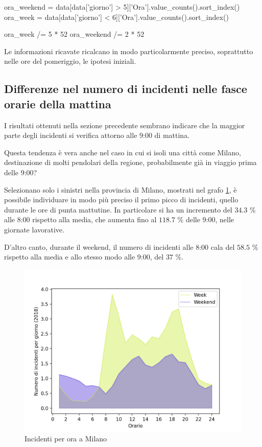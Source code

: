 \documentclass[a4paper,12pt]{report}
\begin{document}
\begin{code}[language=Python]
ora_weekend = data[data['giorno'] > 5]['Ora'].value_counts().sort_index()
ora_week = data[data['giorno'] < 6]['Ora'].value_counts().sort_index()

ora_week /= 5 * 52
ora_weekend /= 2 * 52
\end{code}

Le informazioni ricavate ricalcano in modo particolarmente preciso, 
soprattutto nelle ore del pomeriggio, le ipotesi iniziali. 

\subsection{Differenze nel numero di incidenti nelle fasce orarie della mattina}

I risultati ottenuti nella sezione precedente sembrano indicare 
che la maggior parte degli incidenti si verifica attorno alle 9:00 di mattina. 

Questa tendenza è vera anche nel caso in cui si isoli una città come Milano, 
destinazione di molti pendolari della regione, probabilmente 
già in viaggio prima delle 9:00?

Selezionano solo i sinistri nella provincia di Milano, mostrati nel grafo 
\ref{fig:week-weekend-milano}, è possibile individuare in modo più preciso
il primo picco di incidenti, quello durante le ore di punta mattutine. 
In particolare si ha un incremento del $34.3$ \% alle 8:00 rispetto alla media, 
che aumenta fino al $118.7$ \% delle 9:00, nelle giornate lavorative. 

D'altro canto, durante il weekend, il numero di incidenti alle 8:00 cala del $58.5$ \% rispetto 
alla media e allo stesso modo alle 9:00, del $37$ \%. 

\begin{figure}
    \includegraphics[width=\linewidth]{../src/incidenti/incidenti_senza_coords/ore_punta/week_weekend_milano.png}
    \caption{Incidenti per ora a Milano}
    \label{fig:week-weekend-milano}
\end{figure}
\end{document}
